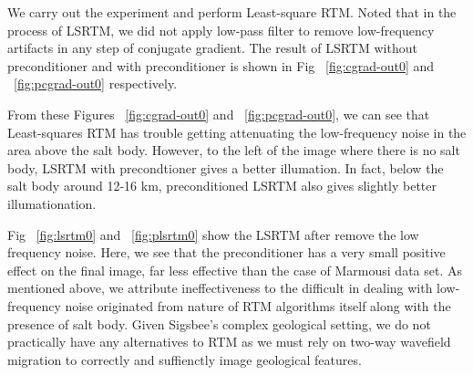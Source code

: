 
We carry out the experiment and perform Least-square RTM. Noted that in the process of LSRTM, we did not apply low-pass filter to remove low-frequency artifacts in any step of conjugate gradient. The result of LSRTM without preconditioner and with preconditioner is shown in Fig ~\ref{fig:cgrad-out0} and ~\ref{fig:pcgrad-out0} respectively.


From these Figures ~\ref{fig:cgrad-out0} and ~\ref{fig:pcgrad-out0}, we can see that Least-squares RTM has trouble getting attenuating the low-frequency noise in the area above the salt body. However, to the left of the image where there is no salt body, LSRTM with precondtioner gives a better illumation. In fact, below the salt body around 12-16 km, preconditioned LSRTM also gives slightly better illumationation. 


Fig ~\ref{fig:lsrtm0} and ~\ref{fig:plsrtm0} show the LSRTM after remove the low frequency noise. Here, we see that the preconditioner has a very small positive effect on the final image, far less effective than the case of Marmousi data set. As mentioned above, we attribute ineffectiveness to the difficult in dealing with low-frequency noise originated from nature of RTM algorithms itself along with the presence of salt body. Given Sigsbee's complex geological setting, we do not practically have any alternatives to RTM as we must rely on two-way wavefield migration to correctly and suffienctly image geological features.
